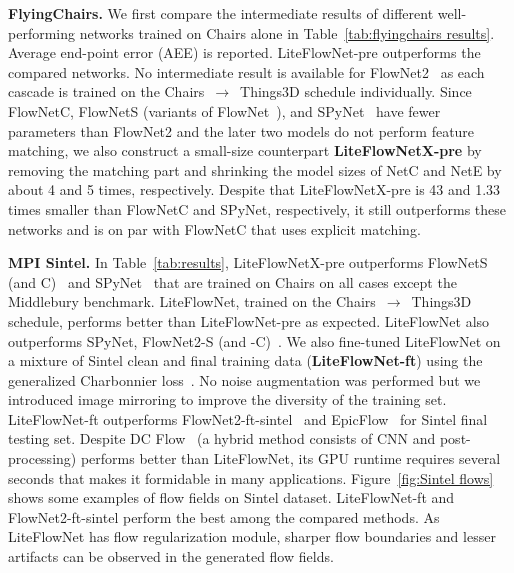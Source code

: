 \documentclass[10pt,twocolumn,letterpaper]{article}
\begin{document}
\vspace{0.1cm}
\noindent
\textbf{FlyingChairs.} We first compare the intermediate results of different well-performing networks trained on Chairs alone in Table~\ref{tab:flyingchairs results}. Average end-point error (AEE) is reported. LiteFlowNet-pre outperforms the compared networks. No intermediate result is available for FlowNet2~\cite{Ilg17} as each cascade is trained on the Chairs~$\rightarrow$~Things3D schedule individually. Since FlowNetC, FlowNetS (variants of FlowNet~\cite{Fischer15}), and SPyNet~\cite{Ranjan17} have fewer parameters than FlowNet2 and the later two models do not perform feature matching, we also construct a small-size counterpart \textbf{LiteFlowNetX-pre} by removing the matching part and shrinking the model sizes of NetC and NetE by about 4 and 5 times, respectively. Despite that LiteFlowNetX-pre is 43 and 1.33 times smaller than FlowNetC and SPyNet, respectively, it still outperforms these networks and is on par with FlowNetC that uses explicit matching. 

\vspace{0.1cm}
\noindent
\textbf{MPI Sintel.} In Table~\ref{tab:results}, LiteFlowNetX-pre outperforms FlowNetS (and C)~\cite{Fischer15} and SPyNet~\cite{Ranjan17} that are trained on Chairs on all cases except the Middlebury benchmark. LiteFlowNet, trained on the Chairs~$\rightarrow$~Things3D schedule, performs better than LiteFlowNet-pre as expected. LiteFlowNet also outperforms SPyNet, FlowNet2-S (and -C)~\cite{Ilg17}.
%
We also fine-tuned LiteFlowNet on a mixture of Sintel clean and final training data (\textbf{LiteFlowNet-ft}) using the generalized Charbonnier loss~\cite{Sun14}. No noise augmentation was performed but we introduced image mirroring to improve the diversity of the training set. LiteFlowNet-ft outperforms FlowNet2-ft-sintel~\cite{Ilg17} and EpicFlow~\cite{Revaud15} for Sintel final testing set. Despite DC Flow~\cite{Xu17} (a hybrid method consists of CNN and post-processing) performs better than LiteFlowNet, its GPU runtime requires several seconds that makes it formidable in many applications. Figure~\ref{fig:Sintel flows} shows some examples of flow fields on Sintel dataset. LiteFlowNet-ft and FlowNet2-ft-sintel perform the best among the compared methods. As LiteFlowNet has flow regularization module, sharper flow boundaries and lesser artifacts can be observed in the generated flow fields. 
\end{document}
